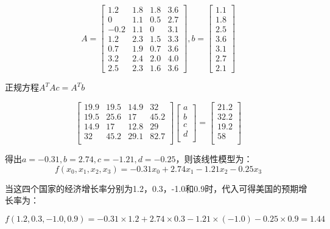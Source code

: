\documentclass[a4paper, 12pt]{article}
\begin{document}
$$A = \begin{bmatrix}
1.2& 1.8& 1.8& 3.6\\
0& 1.1& 0.5& 2.7\\
-0.2& 1.1& 0& 3.1\\
1.2& 2.3& 1.5& 3.3\\
0.7& 1.9& 0.7& 3.6\\
3.2& 2.4& 2.0& 4.0\\
2.5& 2.3& 1.6& 3.6
\end{bmatrix}, 
b = \begin{bmatrix}
1.1\\
1.8\\
2.5\\
3.6\\
3.1\\
2.7\\
2.1
\end{bmatrix}$$

正规方程\begin{math}A^{T}Ac = A^{T}b\end{math}

\[
\left[ {\begin{array}{cccc}
19.9&   	19.5&   	14.9&   	32\\
19.5&   	25.6&   	17&   	45.2\\
14.9&   	17&   	12.8&   	29\\
32&   	45.2&   	29.1&   	82.7\\
\end{array}} \right]\left[ {\begin{array}{c}
a\\
b\\
c\\
d\\
\end{array}} \right] = \left[ {\begin{array}{c}
21.2\\
32.2\\
19.2\\
58\\
\end{array}} \right]
\]

得出\begin{math}a = -0.31, b = 2.74, c = -1.21, d = -0.25\end{math}，则该线性模型为：\begin{displaymath}f(x_{0}, x_{1}, x_{2}, x_{3}) = -0.31x_{0} + 2.74x_{1} - 1.21x_{2} - 0.25x_{3}\end{displaymath}

当这四个国家的经济增长率分别为1.2，0.3，-1.0和0.9时，代入可得美国的预期增长率为：

\begin{math}f(1.2, 0.3, -1.0, 0.9) = -0.31\times1.2 + 2.74\times0.3 - 1.21\times(-1.0) - 0.25\times0.9 
= 1.44\end{math}
\end{document}
